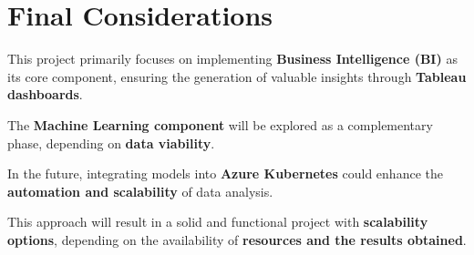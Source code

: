 \section{Final Considerations}

This project primarily focuses on implementing \textbf{Business 
Intelligence (BI)} as its core component, ensuring the generation 
of valuable insights through \textbf{Tableau dashboards}. 

The \textbf{Machine Learning component} will be explored as a 
complementary phase, depending on \textbf{data viability}. 

In the future, integrating models into \textbf{Azure Kubernetes} 
could enhance the \textbf{automation and scalability} of data 
analysis.

This approach will result in a solid and functional project with 
\textbf{scalability options}, depending on the availability of 
\textbf{resources and the results obtained}.